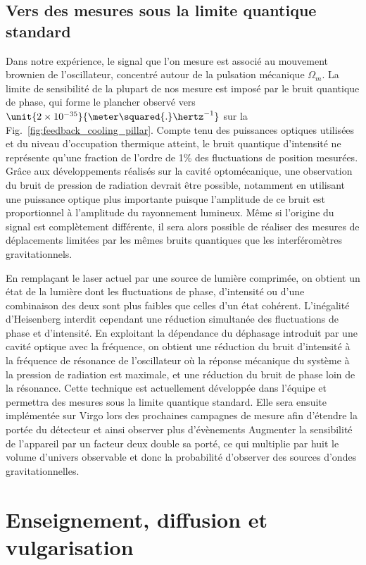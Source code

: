 \documentclass[12pt,a4paper]{article}
\begin{document}
\subsection{Vers des mesures sous la limite quantique standard}
\label{sec:prospects}

Dans notre expérience, le signal que l'on mesure est associé au mouvement brownien de l'oscillateur, concentré autour de la pulsation mécanique $\Omega_m$.
La limite de sensibilité de la plupart de nos mesure est imposé par le bruit quantique de phase, qui forme le plancher observé vers $\unit{2\times10^{-35}}{\meter\squared{.}\hertz^{-1}}$ sur la Fig.~\ref{fig:feedback_cooling_pillar}.
Compte tenu des puissances optiques utilisées et du niveau d'occupation thermique atteint, le bruit quantique d'intensité ne représente qu'une fraction de l'ordre de \unit{1}{\%} des fluctuations de position mesurées.
Grâce aux développements réalisés sur la cavité optomécanique, une observation du bruit de pression de radiation devrait être possible, notamment en utilisant une puissance optique plus importante puisque l'amplitude de ce bruit est proportionnel à l'amplitude du rayonnement lumineux.
Même si l'origine du signal est complètement différente, il sera alors possible de réaliser des mesures de déplacements limitées par les mêmes bruits quantiques que les interféromètres gravitationnels.

En remplaçant le laser actuel par une source de lumière comprimée, on obtient un état de la lumière dont les fluctuations de phase, d'intensité ou d'une combinaison des deux sont plus faibles que celles d'un état cohérent.
L'inégalité d'Heisenberg interdit cependant une réduction simultanée des fluctuations de phase et d'intensité.
En exploitant la dépendance du déphasage introduit par une cavité optique avec la fréquence, on obtient une réduction du bruit d'intensité à la fréquence de résonance de l'oscillateur où la réponse mécanique du système à la pression de radiation est maximale,  et une réduction du bruit de phase loin de la résonance.
Cette technique est actuellement développée dans l'équipe et permettra des mesures sous la limite quantique standard.
Elle sera ensuite implémentée sur Virgo lors des prochaines campagnes de mesure afin d'étendre la portée du détecteur et ainsi observer plus d'évènements
Augmenter la sensibilité de l'appareil par un facteur deux double sa porté, ce qui multiplie par huit le volume d'univers observable et donc la probabilité d'observer des sources d'ondes gravitationnelles.

\section{Enseignement, diffusion et vulgarisation}
\end{document}

